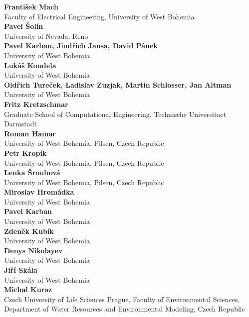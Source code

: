 \documentclass[article,A4,11pt]{llncs}%
\begin{document}
    {\bf František Mach}\\
    Faculty of Electrical Engineering, University of West Bohemia\\
        \noindent
    {\bf Pavel Šolín}\\
    University of Nevada, Reno\\
        \noindent
    {\bf Pavel Karban, Jindřich Jansa, David Pánek}\\
    University of West Bohemia\\
        \noindent
    {\bf Lukáš Koudela}\\
    University of West Bohemia\\
        \noindent
    {\bf Oldřich Tureček, Ladislav Zuzjak, Martin Schlosser, Jan Altman}\\
    University of West Bohemia\\
        \noindent
    {\bf Fritz Kretzschmar}\\
    Graduate School of Computational Engineering,  Technische Universitaet Darmstadt\\
        \noindent
    {\bf Roman Hamar}\\
    University of West Bohemia, Pilsen, Czech Republic\\
        \noindent
    {\bf Petr Krop\'{i}k}\\
    University of West Bohemia, Pilsen, Czech Republic\\
        \noindent
    {\bf Lenka \v{S}roubov\'{a}}\\
    University of West Bohemia, Pilsen, Czech Republic\\
        \noindent
    {\bf Miroslav Hromádka}\\
    University of West Bohemia\\
        \noindent
    {\bf Pavel Karban}\\
    University of West Bohemia\\
        \noindent
    {\bf Zdeněk Kubík}\\
    University of West Bohemia\\
        \noindent
    {\bf Denys Nikolayev}\\
    University of West Bohemia\\
        \noindent
    {\bf Jiří Skála}\\
    University of West Bohemia\\
        \noindent
    {\bf Michal Kuraz}\\
    Czech University of Life Sciences Prague, Faculty of Environmental Sciences, Department of Water Resources and Environmental Modeling, Czech Republic\\
\end{document}
